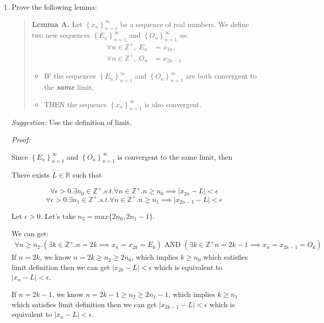 \documentclass[12pt]{exam}
\newcommand {\DS} [1] {${\displaystyle #1}$}
\newcommand{\vv}{\vspace{.1cm}}
\newcommand{\R}{\mathbb{R}}
\newcommand{\Z}{\mathbb{Z}}
\begin{document}
\begin{enumerate}

\item Prove the following lemma:
	\begin{quotation} \noindent
	{\bf Lemma A.}
		 Let \DS{\left\{x_n\right\}_{n=1}^{\infty}} be a sequence of real numbers.  We define two new sequences \DS{\left\{E_n\right\}_{n=1}^{\infty}} and \DS{\left\{O_n\right\}_{n=1}^{\infty}} as:
			$$
			\begin{aligned}
				\forall n \in \Z^+, \; E_n&=x_{2n}, \\
				\forall n \in \Z^+, \; O_n&=x_{2n-1} 
			\end{aligned}
			$$
		\begin{itemize}
			\item IF the sequences \DS{\left\{E_n\right\}_{n=1}^{\infty}} and \DS{\left\{O_n\right\}_{n=1}^{\infty}} are both convergent to the {\bf \emph{same}} limit,
			\item THEN the sequence \DS{\left\{x_n\right\}_{n=1}^{\infty}} is also convergent.
		\end{itemize}
	\end{quotation}
	\emph{Suggestion:} Use the definition of limit.

\vv

\emph{Proof:}

Since \DS{\left\{E_n\right\}_{n=1}^{\infty}} and \DS{\left\{O_n\right\}_{n=1}^{\infty}} is convergent to the same limit, then

There exists $L \in \R$ such that

$$
	\forall \epsilon > 0. \exists n_0 \in \Z^+. s.t. \forall n \in \Z^+. n \geq n_0 \implies | x_{2n} - L | < \epsilon
$$
$$
	\forall \epsilon > 0. \exists n_1 \in \Z^+. s.t. \forall n \in \Z^+. n \geq n_1 \implies | x_{2n-1} - L | < \epsilon
$$

Let $\epsilon >0$. Let's take $n_2 = max\{2n_0, 2n_1-1\}$.

We can get:
\begin{align*}
    \forall n\geq n_2. (\exists k\in\Z^+.n=2k \implies x_n=x_{2k}=E_k) \mbox{ AND } (\exists k\in\Z^+ n=2k-1 \implies x_n=x_{2k-1}=O_k)
\end{align*}
If $n=2k$, we know $n=2k\geq n_2\geq 2n_0$, which implies $k\geq n_0$ which satisfies limit definition then we can get $|x_{2k}-L|<\epsilon$ which is equivalent to $|x_n-L|<\epsilon$.

If $n=2k-1$, we know $n=2k-1\geq n_2\geq 2n_1-1$, which implies $k\geq n_1$ which satisfies limit definition then we can get $|x_{2k-1}-L|<\epsilon$ which is equivalent to $|x_n-L|<\epsilon$.


\end{enumerate}
\end{document}
